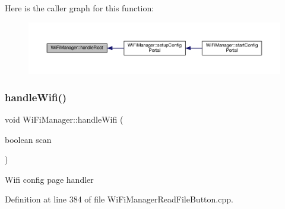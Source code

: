 Here is the caller graph for this function\+:
\nopagebreak
\begin{figure}[H]
\begin{center}
\leavevmode
\includegraphics[width=350pt]{d4/dc8/class_wi_fi_manager_a47e4c7df7478f690c53ff9f5125c9760_icgraph}
\end{center}
\end{figure}
\mbox{\label{class_wi_fi_manager_a57a9048175c1918340ab9d0a2c53601f}} 
\subsubsection{\texorpdfstring{handle\+Wifi()}{handleWifi()}}
{\footnotesize\ttfamily void Wi\+Fi\+Manager\+::handle\+Wifi (\begin{DoxyParamCaption}\item[{boolean}]{scan }\end{DoxyParamCaption})\hspace{0.3cm}{\ttfamily [private]}}

Wifi config page handler 

Definition at line 384 of file Wi\+Fi\+Manager\+Read\+File\+Button.\+cpp.



